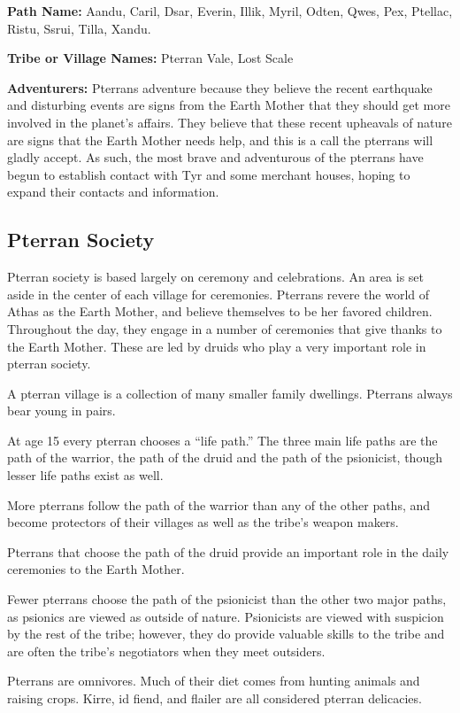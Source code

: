 \textbf{Path Name:} Aandu, Caril, Dsar, Everin, Illik, Myril, Odten, Qwes, Pex, Ptellac, Ristu, Ssrui, Tilla, Xandu.

\textbf{Tribe or Village Names:} Pterran Vale, Lost Scale

\textbf{Adventurers:} Pterrans adventure because they believe the recent earthquake and disturbing events are signs from the Earth Mother that they should get more involved in the planet's affairs. They believe that these recent upheavals of nature are signs that the Earth Mother needs help, and this is a call the pterrans will gladly accept. As such, the most brave and adventurous of the pterrans have begun to establish contact with Tyr and some merchant houses, hoping to expand their contacts and information.

\subsection{Pterran Society}
Pterran society is based largely on ceremony and celebrations. An area is set aside in the center of each village for ceremonies. Pterrans revere the world of Athas as the Earth Mother, and believe themselves to be her favored children. Throughout the day, they engage in a number of ceremonies that give thanks to the Earth Mother. These are led by druids who play a very important role in pterran society.

A pterran village is a collection of many smaller family dwellings. Pterrans always bear young in pairs.

At age 15 every pterran chooses a ``life path.'' The three main life paths are the path of the warrior, the path of the druid and the path of the psionicist, though lesser life paths exist as well.

More pterrans follow the path of the warrior than any of the other paths, and become protectors of their villages as well as the tribe's weapon makers.

Pterrans that choose the path of the druid provide an important role in the daily ceremonies to the Earth Mother.

Fewer pterrans choose the path of the psionicist than the other two major paths, as psionics are viewed as outside of nature. Psionicists are viewed with suspicion by the rest of the tribe; however, they do provide valuable skills to the tribe and are often the tribe's negotiators when they meet outsiders.

Pterrans are omnivores. Much of their diet comes from hunting animals and raising crops. Kirre, id fiend, and flailer are all considered pterran delicacies.

